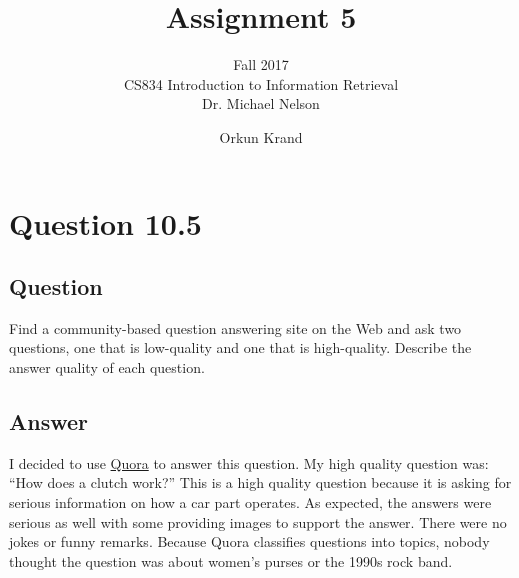 \documentclass[10pt,letterpaper,bibliography=totoc]{scrartcl}
\begin{document}
\author{Orkun Krand}
\title{Assignment 5}
\subtitle{Fall 2017\\ CS834 Introduction to Information Retrieval\\ Dr. Michael Nelson}
\maketitle
\newpage

\section{Question 10.5}
\subsection {Question}
Find a community-based question answering site on the Web and ask two questions, one that is low-quality and one that is high-quality. Describe the answer quality of each question.

\subsection{Answer}
I decided to use \href{www.quora.com}{Quora} to answer this question. My high quality question was: ``How does a clutch work?'' This is a high quality question because it is asking for serious information on how a car part operates. As expected, the answers were serious as well with some providing images to support the answer. There were no jokes or funny remarks. Because Quora classifies questions into topics, nobody thought the question was about women's purses or the 1990s rock band. 
\end{document}
